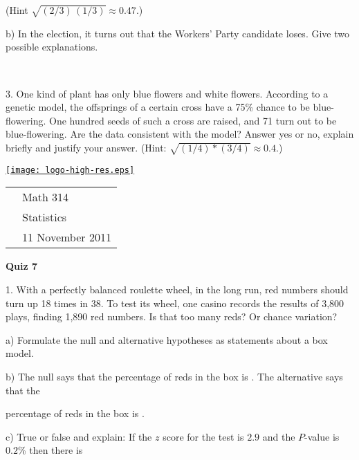 \documentclass[10pt]{article}
\newcommand{\HH}{\hspace{20pt} \hphantom{a)} }
\begin{document}
\HH (Hint $\sqrt{(2/3)\,(1/3)}\approx 0.47$.)
\vspace{2in}

\hspace{20pt} b) In the election, it turns out that the Workers' Party candidate loses.
Give two possible explanations.

\vfill
\eject
{\ }

3. One kind of plant has only blue flowers and white flowers.  According to a 
genetic model, the offsprings of a certain cross have a 75\% chance
to be blue-flowering.  One hundred seeds of such a cross are raised, and
71 turn out to be blue-flowering.  Are the data consistent with the model?  
Answer yes or no,  explain briefly and justify your 
answer. (Hint:  $\sqrt{(1/4)*(3/4)} \approx 0.4$.)
\vfill
\eject

\href{http://www.shepherd.edu}{\texttt{[image: logo-high-res.eps]}}
\vspace{-1.79cm}

{\small
\begin{tabular}{cl}
& Math 314\\
& Statistics\\
\hspace{5.28in} & 11 November 2011
\end{tabular}
}
\setlength{\baselineskip}{1.05\baselineskip}

\begin{center}
\textbf{\large  Quiz 7}
\end{center}

1. With a perfectly balanced roulette wheel, in the long run, 
red numbers should turn up 18 times in 38.
To test its wheel, one casino records the results of 3,800 plays, finding 1,890 red
numbers.  Is that too many reds?  Or chance variation?

\hspace{20pt} a) Formulate the null and alternative hypotheses as 
statements about a box model.
\vspace{1.5in}

\hspace{20pt} b) The null says that the percentage of reds in the box is
\underline{\hspace{30pt}}.  The alternative says that the\vspace{-4pt}

\HH percentage of reds in the box is 
\underline{\hspace{30pt}}.
\bigskip
\bigskip


\hspace{20pt} c) True or false and explain:
If the $z$ score for the test is $2.9$ and the $P$-value is $0.2$\%
then there is\vspace{-4pt}
\end{document}
